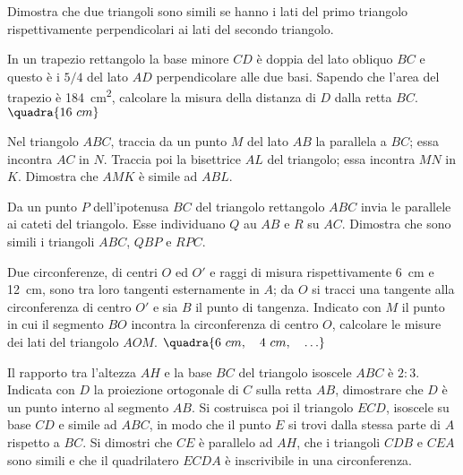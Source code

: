 \begin{multicols}{2}
\begin{esercizio}
\label{ese:6.68}
Dimostra che due triangoli sono simili se hanno i lati del primo 
triangolo rispettivamente perpendicolari ai lati del secondo 
triangolo. 
\end{esercizio}

\begin{esercizio}
\label{ese:6.69}
In un trapezio rettangolo la base minore \(CD\) è doppia del lato 
obliquo \(BC\) e questo è i \(5/4\) del lato \(AD\) perpendicolare alle due 
basi. Sapendo che l'area del trapezio è 184~cm\textsuperscript{2}, 
calcolare la misura della distanza di \(D\) dalla retta \(BC\).  
\hfill\(\quadra{16~cm}\)
\end{esercizio}

\begin{esercizio}
\label{ese:6.70}
Nel triangolo \(ABC\), traccia da un punto \(M\) del lato \(AB\) la 
parallela a \(BC\); essa incontra \(AC\) in \(N\). Traccia poi la 
bisettrice \(AL\) del triangolo; essa incontra \(MN\) in \(K\). Dimostra che 
\(AMK\) è simile ad \(ABL\).
\end{esercizio}

\begin{esercizio}
\label{ese:6.71}
Da un punto \(P\) dell'ipotenusa \(BC\) del triangolo rettangolo \(ABC\) 
invia le parallele ai cateti del triangolo. Esse individuano \(Q\) au 
\(AB\) e \(R\) su \(AC\). Dimostra che sono simili i triangoli \(ABC\), \(QBP\) 
e \(RPC\).
\end{esercizio}

\begin{esercizio}
\label{ese:6.72}
Due circonferenze, di centri \(O\) ed \(O'\) e raggi di misura 
rispettivamente 6~cm e 12~cm, sono tra loro tangenti esternamente in 
\(A\); da \(O\) si tracci una tangente alla circonferenza di centro \(O'\) 
e sia \(B\) il punto di tangenza. Indicato con \(M\) il punto in cui il 
segmento \(BO\) incontra la circonferenza di centro \(O\), calcolare le 
misure dei lati del triangolo \(AOM\).
\hfill\(\quadra{6~cm,\quad 4~cm,\quad \ldots}\)
\end{esercizio}

\begin{esercizio}
\label{ese:6.73}
Il rapporto tra l'altezza \(AH\) e la base \(BC\) del triangolo isoscele 
\(ABC\) è \(2:3\). Indicata con \(D\) la proiezione ortogonale di \(C\) sulla 
retta \(AB\), dimostrare che \(D\) è un punto interno al segmento \(AB\). 
Si costruisca poi il triangolo \(ECD\), isoscele su base \(CD\) e simile 
ad \(ABC\), in modo che il punto \(E\) si trovi dalla stessa parte di \(A\) 
rispetto a \(BC\). Si dimostri che \(CE\) è parallelo ad \(AH\), che i 
triangoli \(CDB\) e \(CEA\) sono simili e che il quadrilatero \(ECDA\) è 
inscrivibile in una circonferenza.
\end{esercizio}


\end{multicols}
